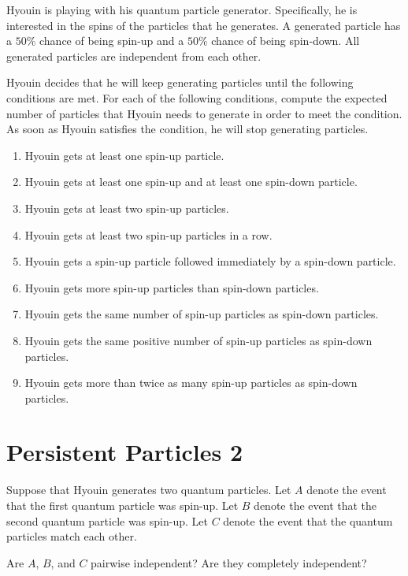 \documentclass{article}
\begin{document}
Hyouin is playing with his quantum particle generator. Specifically, he is interested in the spins of the particles that he generates. A generated particle has a $50\%$ chance of being spin-up and a $50\%$ chance of being spin-down. All generated particles are independent from each other.

Hyouin decides that he will keep generating particles until the following conditions are met. For each of the following conditions, compute the expected number of particles that Hyouin needs to generate in order to meet the condition. As soon as Hyouin satisfies the condition, he will stop generating particles.

\begin{enumerate}[label=(\alph*)]
\itemsep0em
    \item Hyouin gets at least one spin-up particle.\vfill
    \item Hyouin gets at least one spin-up and at least one spin-down particle.\vfill
    \item Hyouin gets at least two spin-up particles.\vfill
    \item Hyouin gets at least two spin-up particles in a row.\vfill
    \item Hyouin gets a spin-up particle followed immediately by a spin-down particle.\vfill
    \item Hyouin gets more spin-up particles than spin-down particles.\vfill
    \item Hyouin gets the same number of spin-up particles as spin-down particles.\vfill
    \item Hyouin gets the same positive number of spin-up particles as spin-down particles.\vfill
    \item Hyouin gets more than twice as many spin-up particles as spin-down particles.\vfill
\end{enumerate}

\newpage

\section{Persistent Particles 2}

Suppose that Hyouin generates two quantum particles. Let $A$ denote the event that the first quantum particle was spin-up. Let $B$ denote the event that the second quantum particle was spin-up. Let $C$ denote the event that the quantum particles match each other.

Are $A$, $B$, and $C$ pairwise independent? Are they completely independent?
\end{document}
